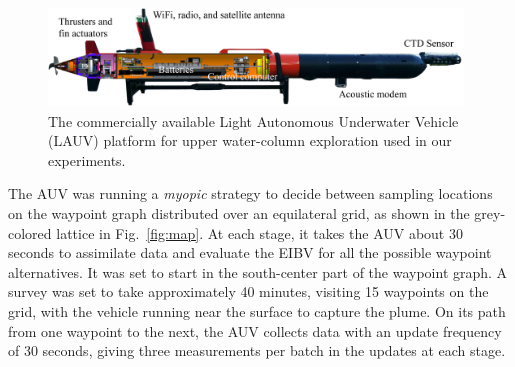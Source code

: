 \documentclass[aoas]{imsart}
\begin{document}
\begin{figure}[!h] 
\centering 
\includegraphics[width=0.98\textwidth]{Figures/harald.jpg}
\caption{The commercially available Light Autonomous Underwater
  Vehicle (LAUV) platform for upper water-column exploration used in
  our experiments.}
\label{fig:lauv}
\end{figure} 

The AUV was running a \textit{myopic} strategy to decide between
sampling locations on the waypoint graph distributed over an
equilateral grid, as shown in the grey-colored lattice in
Fig.~\ref{fig:map}.  At each stage, it takes the AUV about 30 seconds
to assimilate data and evaluate the EIBV for all the possible waypoint alternatives.  It
was set to start in the south-center part of the waypoint graph. A
survey was set to take approximately 40 minutes, visiting 15 waypoints
on the grid, with the vehicle running near the surface to capture the
plume. On its path from one waypoint to the next, the AUV collects
data with an update frequency of 30 seconds, giving three measurements
per batch in the updates at each stage.
\end{document}
